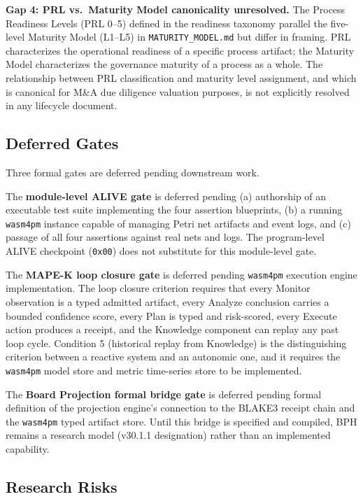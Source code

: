 \textbf{Gap 4: PRL vs.\ Maturity Model canonicality unresolved.} The Process
Readiness Levels (PRL 0--5) defined in the readiness taxonomy parallel the five-level
Maturity Model (L1--L5) in \texttt{MATURITY\_MODEL.md} but differ in framing. PRL
characterizes the operational readiness of a specific process artifact; the Maturity
Model characterizes the governance maturity of a process as a whole. The relationship
between PRL classification and maturity level assignment, and which is canonical for
M\&A due diligence valuation purposes, is not explicitly resolved in any lifecycle
document.

\subsection{Deferred Gates}
\label{sec:lifecycle-open-deferred}

Three formal gates are deferred pending downstream work.

The \textbf{module-level ALIVE gate} is deferred pending (a) authorship of an
executable test suite implementing the four assertion blueprints, (b) a running
\texttt{wasm4pm} instance capable of managing Petri net artifacts and event logs,
and (c) passage of all four assertions against real nets and logs. The program-level
ALIVE checkpoint (\texttt{0x00}) does not substitute for this module-level gate.

The \textbf{MAPE-K loop closure gate} is deferred pending \texttt{wasm4pm} execution
engine implementation. The loop closure criterion requires that every Monitor
observation is a typed admitted artifact, every Analyze conclusion carries a bounded
confidence score, every Plan is typed and risk-scored, every Execute action produces a
receipt, and the Knowledge component can replay any past loop cycle. Condition 5
(historical replay from Knowledge) is the distinguishing criterion between a reactive
system and an autonomic one, and it requires the \texttt{wasm4pm} model store and
metric time-series store to be implemented.

The \textbf{Board Projection formal bridge gate} is deferred pending formal definition
of the projection engine's connection to the BLAKE3 receipt chain and the
\texttt{wasm4pm} typed artifact store. Until this bridge is specified and compiled,
BPH remains a research model (v30.1.1 designation) rather than an implemented
capability.

\subsection{Research Risks}
\label{sec:lifecycle-open-risks}

